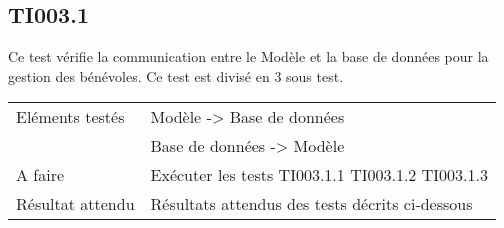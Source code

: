 \subsection{TI003.1}
  		Ce test vérifie la communication entre le Modèle et la base de données pour la gestion des bénévoles. Ce test est divisé en 3 sous test.
  	
 
 	 \begin{center}
    	 	\begin{tabular}[h]{|p{}|p{}|}
		\hline
			Eléments testés & Modèle -> Base de données  \\
						    &  Base de données -> Modèle \\\hline
    			A faire & Exécuter les tests TI003.1.1 TI003.1.2 TI003.1.3 \\\hline
    			Résultat attendu & Résultats attendus des tests décrits ci-dessous \\\hline
     	\end{tabular}
  	\end{center}	
  	

  		



		
  		
  		

  		
  		
